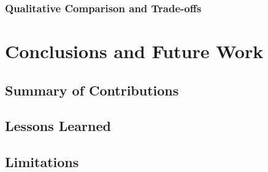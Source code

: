\documentclass[a4paper,twoside]{sapthesis}
\begin{document}
\subsection{Qualitative Comparison and Trade-offs}


\chapter{Conclusions and Future Work}
\label{ch:conclusions}


\section{Summary of Contributions}
\label{sec:summary}

\section{Lessons Learned}
\label{sec:lessons}

\section{Limitations}
\label{sec:limitations}
\end{document}
